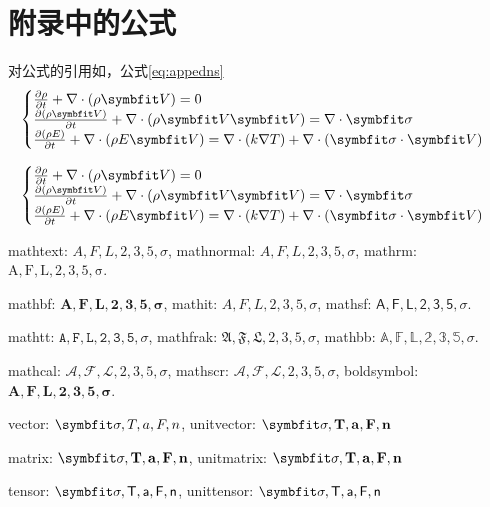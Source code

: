 
\thispagestyle{appendixheader}
\setcounter{app_fig}{1}
\setcounter{app_tab}{1}
\setcounter{equation}{0}
\renewcommand\theequation{附\arabic{app}-\arabic{equation}}
\renewcommand\chaptername{附录}
\renewcommand\chaptername{Appendix}
\renewcommand\thechapter{附录\zhnum{app}}

\setcounter{chapter}{0}
\setcounter{section}{0}
\chapter{附录中的公式}\label{chap:app1}{

	对公式的引用如，公式\eqref{eq:appedns}
	\begin{equation} \label{eq:appedns}
		\begin{cases}
			\frac{\partial \rho}{\partial t} + \nabla\cdot(\rho\Vector{V}) = 0                                                \\
			\frac{\partial (\rho\Vector{V})}{\partial t} + \nabla\cdot(\rho\Vector{V}\Vector{V}) = \nabla\cdot\Tensor{\sigma} \\
			\frac{\partial (\rho E)}{\partial t} + \nabla\cdot(\rho E\Vector{V}) = \nabla\cdot(k\nabla T) + \nabla\cdot(\Tensor{\sigma}\cdot\Vector{V})
		\end{cases}
	\end{equation}

	\begin{equation} \label{eq:appedns2}
		\begin{cases}
			\frac{\partial \rho}{\partial t} + \nabla\cdot(\rho\Vector{V}) = 0                                                \\
			\frac{\partial (\rho\Vector{V})}{\partial t} + \nabla\cdot(\rho\Vector{V}\Vector{V}) = \nabla\cdot\Tensor{\sigma} \\
			\frac{\partial (\rho E)}{\partial t} + \nabla\cdot(\rho E\Vector{V}) = \nabla\cdot(k\nabla T) + \nabla\cdot(\Tensor{\sigma}\cdot\Vector{V})
		\end{cases}
	\end{equation}


	mathtext: $A,F,L,2,3,5,\sigma$, mathnormal: $A,F,L,2,3,5,\sigma$, mathrm: $\mathrm{A,F,L,2,3,5,\sigma}$.

	mathbf: $\mathbf{A,F,L,2,3,5,\sigma}$, mathit: $\mathit{A,F,L,2,3,5,\sigma}$, mathsf: $\mathsf{A,F,L,2,3,5,\sigma}$.

	mathtt: $\mathtt{A,F,L,2,3,5,\sigma}$, mathfrak: $\mathfrak{A,F,L,2,3,5,\sigma}$, mathbb: $\mathbb{A,F,L,2,3,5,\sigma}$.

	mathcal: $\mathcal{A,F,L,2,3,5,\sigma}$, mathscr: $\mathscr{A,F,L,2,3,5,\sigma}$, boldsymbol: $\boldsymbol{A,F,L,2,3,5,\sigma}$.

	vector: $\Vector{\sigma, T, a, F, n}$, unitvector: $\unitVector{\sigma, T, a, F, n}$

	matrix: $\Matrix{\sigma, T, a, F, n}$, unitmatrix: $\unitMatrix{\sigma, T, a, F, n}$

	tensor: $\Tensor{\sigma, T, a, F, n}$, unittensor: $\unitTensor{\sigma, T, a, F, n}$


	\thispagestyle{appendixheader}
}
